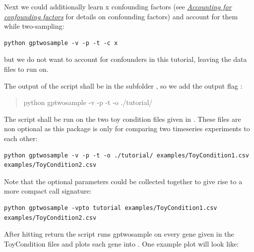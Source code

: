 \documentclass[letterpaper,10pt,english]{sphinxmanual}
\begin{document}
Next we could additionally learn x confounding factors (see
{\hyperref[confounders:confounders]{\emph{Accounting for confounding factors}}} for details on confounding factors) and account
for them while two-sampling:

\begin{Verbatim}[commandchars=\\\{\}]
python gptwosample -v -p -t -c x
\end{Verbatim}

but we do not want to account for confounders in this tutorial,
leaving the data files to run on.

The output of the script shall be in the subfolder , so
we add the output flag :
\begin{quote}

python gptwosample -v -p -t -o ./tutorial/
\end{quote}

The script shall be run on the two toy condition files 
given in . These files
are non optional as this package is only for comparing two timeseries
experiments to each other:

\begin{Verbatim}[commandchars=\\\{\}]
python gptwosample -v -p -t -o ./tutorial/ examples/ToyCondition1.csv examples/ToyCondition2.csv
\end{Verbatim}

Note that the optional parameters could be collected together to give
rise to a more compact call signature:

\begin{Verbatim}[commandchars=\\\{\}]
python gptwosample -vpto tutorial examples/ToyCondition1.csv
examples/ToyCondition2.csv
\end{Verbatim}

After hitting return the script runs gptwosample on every gene given
in the ToyCondition files and plots each gene into
. One example plot will look like:
\end{document}
